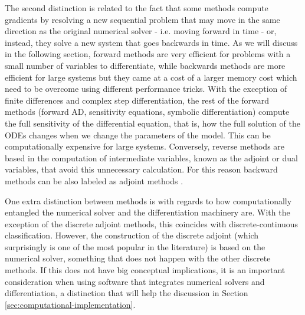 The second distinction is related to the fact that some methods compute gradients by resolving a new sequential problem that may move in the same direction as the original numerical solver - i.e. moving forward in time - or, instead, they solve a new system that goes backwards in time. 
As we will discuss in the following section, forward methods are very efficient for problems with a small number of variables to differentiate, while backwards methods are more efficient for large systems 
but they came at a cost of a larger memory cost which need to be overcome using different performance tricks. 
With the exception of finite differences and complex step differentiation, the rest of the forward methods (forward AD, sensitivity equations, symbolic differentiation) compute the full sensitivity of the differential equation, that is, how the full solution of the ODEs changes when we change the parameters of the model. 
This can be computationally expensive for large systems. 
Conversely, reverse methods are based in the computation of intermediate variables, known as the adjoint or dual variables, that avoid this unnecessary calculation. 
For this reason backward methods can be also labeled as adjoint methods \cite{ma2021comparison}. 

One extra distinction between methods is with regards to how computationally entangled the numerical solver and the differentiation machinery are. 
With the exception of the discrete adjoint methods, this coincides with discrete-continuous classification. 
However, the construction of the discrete adjoint (which surprisingly is one of the most popular in the literature) is based on the numerical solver, something that does not happen with the other discrete methods. 
If this does not have big conceptual implications, it is an important consideration when using software that integrates numerical solvers and differentiation, a distinction that will help the discussion in Section \ref{sec:computational-implementation}.

